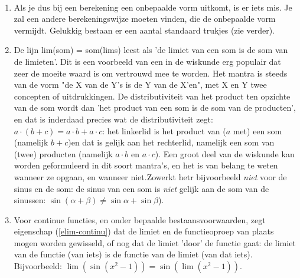 \documentclass[numbers]{ximera}
\begin{document}
\begin{remark} \ 
	
\begin{enumerate}
	\item Als je dus bij een berekening een onbepaalde vorm uitkomt, is er iets mis. Je zal een andere berekeningswijze moeten vinden, die de onbepaalde vorm vermijdt. Gelukkig bestaan er een aantal standaard trukjes (zie verder).
	\item De lijn lim(som) = som(lims) leest als 'de limiet van een som is de som van de limieten'. Dit is een voorbeeld van een in de wiskunde erg populair  dat zeer de moeite waard is om vertrouwd mee te worden. Het mantra is steeds van de vorm "de X van de Y's is de Y van de X'en", met X en Y twee concepten of uitdrukkingen. De distributiviteit van het product ten opzichte van de som wordt dan 'het product van een som is de som van de producten', en dat is inderdaad precies wat de distributiviteit zegt: $a\cdot(b+c) = a\cdot b+a\cdot c$: het linkerlid is het product van ($a$ met) een som (namelijk $b+c$)en dat is gelijk aan het rechterlid, namelijk een som van (twee) producten (namelijk $a\cdot b$ en $a\cdot c$). Een groot deel van de wiskunde kan worden geformuleerd in dit soort mantra's, en het is van belang te weten wanneer ze opgaan, en wanneer niet.Zowerkt hetr bijvoorbeeld \textit{niet} voor de sinus en de som: de sinus van een som is \textit{niet} gelijk aan de som van de sinussen: $\sin(\alpha+\beta) \neq \sin\alpha+\sin\beta$). 
	\item Voor continue functies, en onder bepaalde bestaansvoorwaarden, zegt eigenschap (\ref{elim-continu})  dat de limiet en de functieoproep van plaats mogen worden gewisseld, of nog dat de limiet 'door' de functie gaat: de limiet van de functie (van iets) is de functie van de limiet (van dat iets). Bijvoorbeeld: $\lim(\sin(x^2-1)) = \sin(\lim(x^2-1))$.


\end{enumerate}
\end{remark}
\end{document}

